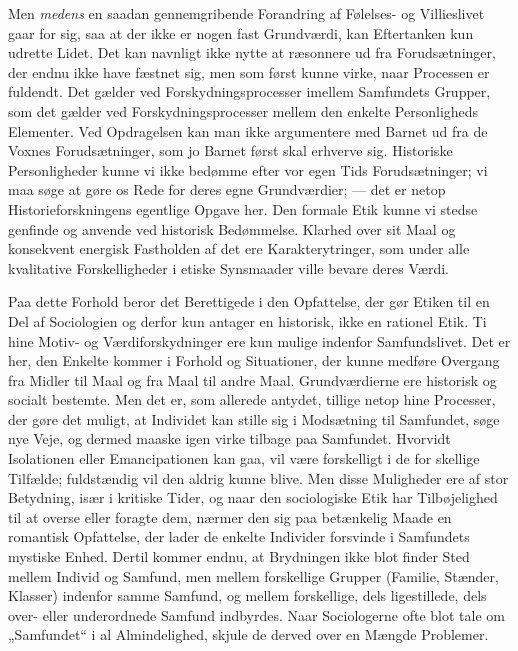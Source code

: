 \documentclass[12pt,a4paper]{book}
\newcommand{\opage}[1]{\marginnote{\footnotesize\textit{[#1]}}}
\begin{document}
Men \emph{medens} en saadan gennemgribende Forandring af Følelses- og Villieslivet gaar for
sig, saa at der ikke er nogen fast Grundværdi, kan Eftertanken kun udrette Lidet. Det kan navnligt ikke nytte at ræsonnere ud fra Forudsætninger, der endnu ikke have fæstnet sig, men
som først kunne virke, naar Processen er fuldendt. Det gælder ved Forskydningsprocesser
imellem Samfundets Grupper, som det gælder ved Forskydningsprocesser mellem den enkelte
Personligheds Elementer. Ved Opdragelsen kan man ikke argumentere med Barnet ud fra de
Voxnes Forudsætninger, som jo Barnet først skal erhverve sig. Historiske Personligheder
kunne vi ikke bedømme efter vor egen Tids Forudsætninger; vi maa søge at gøre os Rede for
deres egne Grundværdier; --- det er netop Historieforskningens egentlige Opgave her. Den
formale Etik kunne vi stedse genfinde og anvende ved historisk Bedømmelse. Klarhed over sit
Maal og konsekvent energisk Fastholden af det ere Karakterytringer, som under alle
kvalitative Forskelligheder i etiske Synsmaader ville bevare deres Værdi.

Paa dette Forhold beror det Berettigede i den Opfattelse, der gør Etiken til en Del af
Sociologien og derfor kun antager en historisk, ikke en rationel Etik. Ti hine Motiv- og
Værdiforskydninger ere kun mulige indenfor Samfundslivet. Det er her, den Enkelte kommer i Forhold og Situationer, der kunne medføre Overgang fra Midler til Maal og fra Maal til
andre Maal. Grundværdierne ere historisk og socialt bestemte. Men det er, som allerede
antydet, tillige netop hine Processer, der gøre det muligt, at Individet kan stille sig i
Modsætning til Samfundet, søge nye Veje, og dermed maaske igen virke tilbage paa Samfundet.
Hvorvidt Isolationen eller Emancipationen kan gaa, vil være forskelligt i de for%
\opage{363}skellige
Tilfælde; fuldstændig vil den aldrig kunne blive. Men disse Muligheder ere af stor
Betydning, især i kritiske Tider, og naar den sociologiske Etik har Tilbøjelighed til at
overse eller foragte dem, nærmer den sig paa betænkelig Maade en romantisk Opfattelse, der
lader de enkelte Individer forsvinde i Samfundets mystiske Enhed. Dertil kommer endnu, at
Brydningen ikke blot finder Sted mellem Individ og Samfund, men mellem forskellige Grupper
(Familie, Stænder, Klasser) indenfor samme Samfund, og mellem forskellige, dels
ligestillede, dels over- eller underordnede Samfund indbyrdes. Naar Sociologerne ofte blot
tale om „Samfundet“ i al Almindelighed, skjule de derved over en Mængde Problemer.
\end{document}
